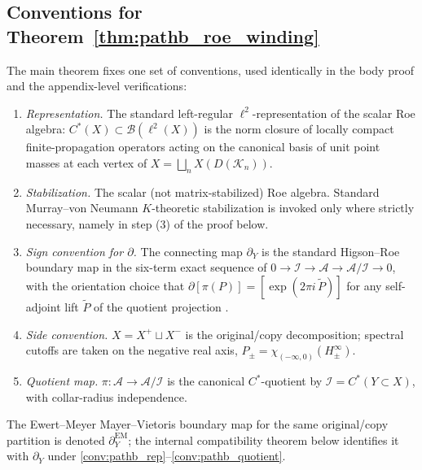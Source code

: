 \documentclass[11pt]{article}
\numberwithin{equation}{section}
\theoremstyle{definition}
\theoremstyle{remark}
\newcommand{\K}{\mathcal{K}}
\begin{document}
\subsection{Conventions for Theorem~\ref{thm:pathb_roe_winding}}\label{sec:pathb_conventions}
The main theorem fixes one set of conventions, used identically in the body proof and the
appendix-level verifications:
\begin{enumerate}[label=(C\arabic*),leftmargin=2.4em]
\item\label{conv:pathb_rep} \emph{Representation.} The standard left-regular
\(\ell^2\)-representation of the scalar Roe algebra: \(C^*(X)\subset\mathcal B(\ell^2(X))\) is the
norm closure of locally compact finite-propagation operators acting on the canonical basis of unit
point masses at each vertex of $X=\bigsqcup_n X(D(\K_n))$.
\item\label{conv:pathb_stab} \emph{Stabilization.} The scalar (not matrix-stabilized) Roe algebra.
Standard Murray--von Neumann \(K\)-theoretic stabilization is invoked only where strictly
necessary, namely in step (3) of the proof below.
\item\label{conv:pathb_sign} \emph{Sign convention for \(\partial\).} The connecting map
\(\partial_Y\) is the standard Higson--Roe boundary map in the six-term exact sequence of
\(0\to\mathcal I\to\mathcal A\to\mathcal A/\mathcal I\to0\), with the orientation choice that
\(\partial[\pi(P)]=[\exp(2\pi i\,\tilde P)]\) for any self-adjoint lift \(\tilde P\) of the
quotient projection \cite{HigsonRoeI,RoeLectures}.
\item\label{conv:pathb_side} \emph{Side convention.} \(X=X^+\sqcup X^-\) is the original/copy
decomposition; spectral cutoffs are taken on the negative real axis,
\(P_\pm=\chi_{(-\infty,0)}(H_\pm^\infty)\).
\item\label{conv:pathb_quotient} \emph{Quotient map.} \(\pi:\mathcal A\to\mathcal A/\mathcal I\) is
the canonical \(C^*\)-quotient by \(\mathcal I=C^*(Y\subset X)\), with collar-radius independence.
\end{enumerate}
The Ewert--Meyer Mayer--Vietoris boundary map for the same original/copy partition is denoted
\(\partial^{\mathrm{EM}}_Y\); the internal compatibility theorem below identifies it with
\(\partial_Y\) under \ref{conv:pathb_rep}--\ref{conv:pathb_quotient}.
\end{document}

